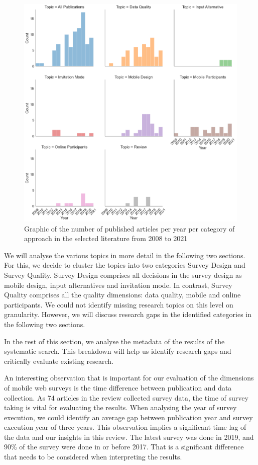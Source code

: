 \begin{figure}
    \centering
    \includegraphics[width=\textwidth]{reports/figures/publications_per_year_per_categories.png}
     \caption{Graphic of the number of published articles per year per category of approach in the selected literature from 2008 to 2021}
    \label{fig: publications_per_year_per_categories}
\end{figure}

We will analyse the various topics in more detail in the following two sections. For this, we decide to cluster the topics into two categories Survey Design and Survey Quality. Survey Design comprises all decisions in the survey design as mobile design, input alternatives and invitation mode. In contrast, Survey Quality comprises all the quality dimensions: data quality, mobile and online participants. We could not identify missing research topics on this level on granularity. However, we will discuss research gaps in the identified categories in the following two sections. 

In the rest of this section, we analyse the metadata of the results of the systematic search. This breakdown will help us identify research gaps and critically evaluate existing research.

An interesting observation that is important for our evaluation of the dimensions of mobile web surveys is the time difference between publication and data collection. As 74 articles in the review collected survey data, the time of survey taking is vital for evaluating the results. When analysing the year of survey execution, we could identify an average gap between publication year and survey execution year of three years. This observation implies a significant time lag of the data and our insights in this review. The latest survey was done in 2019, and 90\% of the survey were done in or before 2017. That is a significant difference that needs to be considered when interpreting the results.  

